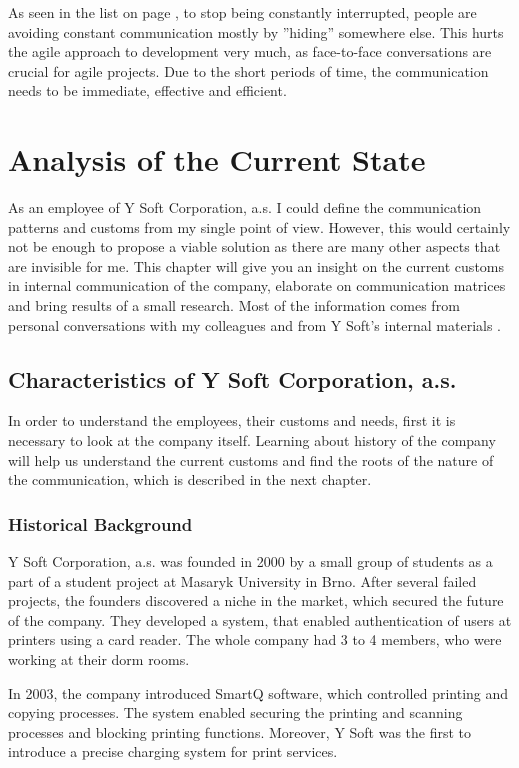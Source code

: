 \documentclass[11pt,singleside]{myfithesis2}
\begin{document}
As seen in the list on page \pageref{list:avoidingCommunication}, to stop being constantly interrupted, people are avoiding constant communication mostly by ''hiding'' somewhere else. This hurts the agile approach to development very much, as face-to-face conversations are crucial for agile projects. Due to the short periods of time, the communication needs to be immediate, effective and efficient.
	
	
\chapter{Analysis of the Current State}

As an employee of Y Soft Corporation, a.s. I could define the communication patterns and customs from my single point of view. However, this would certainly not be enough to propose a viable solution as there are many other aspects that are invisible for me. This chapter will give you an insight on the current customs in internal communication of the company, elaborate on communication matrices and bring results of a small research. Most of the information comes from personal conversations with my colleagues and from Y Soft's internal materials \cite{ysoftInternal}.

	\section{Characteristics of Y Soft Corporation, a.s.}
In order to understand the employees, their customs and needs, first it is necessary to look at the company itself. Learning about history of the company will help us understand the current customs and find the roots of the nature of the communication, which is described in the next chapter.

		\subsection{Historical Background}

Y Soft Corporation, a.s. was founded in 2000 by a small group of students as a part of a student project at Masaryk University in Brno. After several failed projects, the founders discovered a niche in the market, which secured the future of the company. They developed a system, that enabled authentication of users at printers using a card reader. The whole company had 3 to 4 members, who were working at their dorm rooms.

In 2003, the company introduced SmartQ software, which controlled printing and copying processes. The system enabled securing the printing and scanning processes and blocking printing functions. Moreover, Y Soft was the first to introduce a precise charging system for print services.
\end{document}
